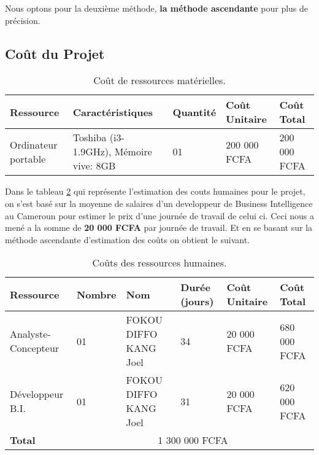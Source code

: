 Nous optons pour la deuxième méthode, \textbf{la méthode ascendante} pour plus de précision.

\subsection{Coût du Projet}
\begin{table}[H]
    \centering
    \caption{Coût de ressources matérielles.}
    \begin{tabular}[t]{|p{3cm}|p{4cm}|p{2cm}|p{3cm}|p{3cm}|}
        \hline
        \textbf{Ressource} & \textbf{Caractéristiques} & \textbf{Quantité} & \textbf{Coût Unitaire} & \textbf{Coût Total}\\
        \hline\hline
        Ordinateur portable & Toshiba (i3-1.9GHz), Mémoire vive: 8GB & 01 & 200 000 FCFA & 200 000 FCFA\\
        \hline\hline
    \end{tabular}
    \label{tab:resmat}
\end{table}%

Dans le tableau \ref{tab:reshum} qui représente l'estimation des couts humaines pour le projet, on s'est basé sur la moyenne de salaires d'un developpeur de Business Intelligence au Cameroun pour estimer le prix d'une journée de travail de celui ci. Ceci nous a mené a la somme de \textbf{20 000 FCFA} par journée de travail. Et en se basant sur la méthode ascendante d'estimation des coûts on obtient le suivant.

\begin{table}[H]
    \centering
    \caption{Coûts des ressources humaines.}
    \begin{tabular}[t]{|p{2cm}|p{1.5cm}|p{3cm}|p{1.5cm}|p{3cm}|p{3cm}|} 
        \hline
        \textbf{Ressource} & \textbf{Nombre} & \textbf{Nom} & \textbf{Durée (jours)} & \textbf{Coût Unitaire} & \textbf{Coût Total}\\
        \hline\hline
        Analyste-Concepteur & 01 & FOKOU DIFFO KANG Joel & 34 & 20 000 FCFA & 680 000 FCFA\\
        \hline
        Développeur B.I. & 01 & FOKOU DIFFO KANG Joel & 31 & 20 000 FCFA & 620 000 FCFA\\
        \hline
        \textbf{Total} & \multicolumn{5}{c|}{1 300 000 FCFA} \\
        \hline\hline
    \end{tabular}
    \label{tab:reshum}
\end{table}%


